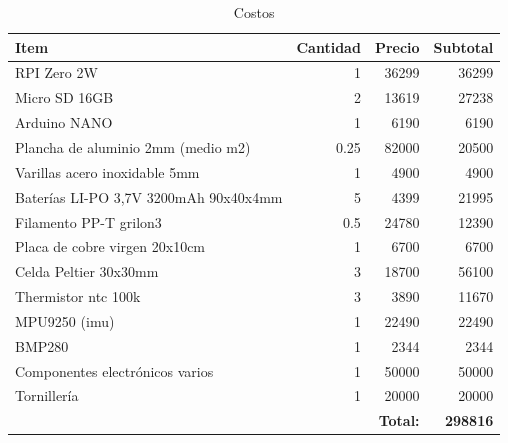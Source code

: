    \begin{table}[H]
     \centering
     \begin{tabular}{|l|r|r|r|}
     \hline
     \textbf{Item} & \textbf{Cantidad} & \textbf{Precio} & \textbf{Subtotal} \\
     \hline
     RPI Zero 2W                            & 1     & 36299  & 36299  \\
     Micro SD 16GB                          & 2     & 13619  & 27238  \\
     Arduino NANO                           & 1     & 6190   & 6190   \\
     Plancha de aluminio 2mm (medio m2)     & 0.25  & 82000  & 20500  \\
     Varillas acero inoxidable 5mm          & 1     & 4900   & 4900   \\
     Baterías LI-PO 3,7V 3200mAh 90x40x4mm   & 5     & 4399   & 21995  \\
     Filamento PP-T grilon3                 & 0.5   & 24780  & 12390  \\
     Placa de cobre virgen 20x10cm          & 1     & 6700   & 6700   \\
     Celda Peltier 30x30mm                  & 3     & 18700  & 56100  \\
     Thermistor ntc 100k                    & 3     & 3890   & 11670  \\
     MPU9250 (\acrshort{imu})               & 1     & 22490  & 22490  \\
     BMP280                                 & 1     & 2344   & 2344   \\
     Componentes electrónicos varios        & 1     & 50000  & 50000  \\
     Tornillería                            & 1     & 20000  & 20000  \\
     \hline
     \multicolumn{3}{|r|}{\textbf{Total:}} & \textbf{298816} \\
     \hline
     \end{tabular}
     \caption{Costos}
     \label{tab:costos}
   \end{table}
